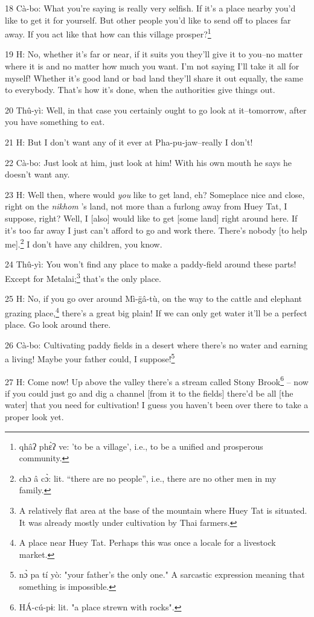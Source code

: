 18 Cà-bo: What you're saying is really very selfish. If it's a place nearby you'd
like to get it for yourself. But other people you'd like to send off to places
far away. If you act like that how can this village prosper?\footnote{qhâʔ phɛ̀ʔ ve: 'to be a village', i.e., to be a unified and prosperous community.}

19 H: No, whether it's far or near, if it suits you they'll give it to you--no
matter where it is and no matter how much you want. I'm not saying I'll take it
all for myself! Whether it's good land or bad land they'll share it out equally,
the same to everybody. That's how it's done, when the authorities give things out.

20 Thû-yì: Well, in that case you certainly ought to go look at it--tomorrow,
after you have something to eat.

21 H: But I don't want any of it ever at Pha-pu-jaw--really I don't!

22 Cà-bo: Just look at him, just look at him! With his own mouth he says he doesn't
want any.

23 H: Well then, where would  \textit{you } like to get land, eh? Someplace nice
and close, right on the  \textit{nikhom }'s land, not more than a furlong away
from Huey Tat, I suppose, right? Well, I [also] would like to get [some land] right
around here. If it's too far away I just can't afford to go and work there. There's
nobody [to help me].\footnote{chɔ â cɔ̀: lit. ``there are no people'', i.e., there are no other men in my family.} I don't have any children, you know.

24 Thû-yì: You won't find any place to make a paddy-field around these parts!
Except for Metalai;\footnote{A relatively flat area at the base of the mountain where Huey Tat is situated. It was already mostly under cultivation by Thai farmers.} that's the only place.

25 H: No, if you go over around Mì-g̈â-tù, on the way to the cattle and elephant
grazing place,\footnote{A place near Huey Tat. Perhaps this was once a locale for a livestock market.} there's a great big plain! If we can only get water it'll be
a perfect place. Go look around there.

26 Cà-bo: Cultivating paddy fields in a desert where there's no water and earning
a living! Maybe your father could, I suppose!\footnote{nɔ̀ pa tí yò: "your father's the only one." A sarcastic expression meaning that something is impossible.}

27 H: Come now! Up above the valley there's a stream called Stony Brook\footnote{HÁ-cú-pɨ: lit. "a place strewn with rocks".} --
now if you could just go and dig a channel [from it to the fields] there'd be all
[the water] that you need for cultivation! I guess you haven't been over there
to take a proper look yet.

